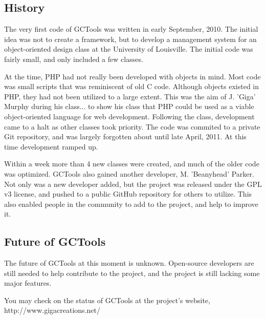\documentclass{article}
\begin{document}
\subsection{History}
The very first code of GCTools was written in early September, 2010. The initial idea was not to create a
framework, but to develop a management system for an object-oriented design class at the University of
Louisville. The initial code was fairly small, and only included a few classes.

At the time, PHP had not really been developed with objects in mind. Most code was small scripts that was reminiscent of old C code. Although objects existed in PHP, they had not been utilized to a large extent. This was the aim of J. 'Giga' Murphy during his class... to show his class that PHP could be used as a viable object-oriented language for web development. Following the class, development came to a halt as other classes took priority. The code was commited to a private Git repository, and was largely forgotten about until late April, 2011. At this time development ramped up.

Within a week more than 4 new classes were created, and much of the older code was optimized. GCTools also gained another developer, M. 'Beanyhead' Parker. Not only was a new developer added, but the project was released under the GPL v3 license, and pushed to a public GitHub repository for others to utilize. This also enabled people in the community to add to the project, and help to improve it.

\subsection{Future of GCTools}
The future of GCTools at this moment is unknown. Open-source developers are still needed to help contribute to the project, and the project is still lacking some major features.

You may check on the status of GCTools at the project's website, http://www.gigacreations.net/

\newpage
\end{document}

